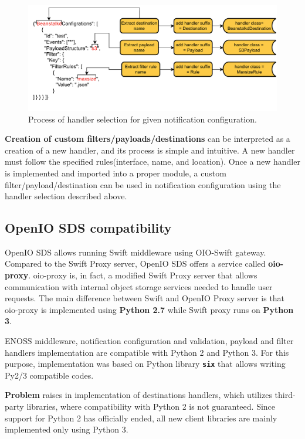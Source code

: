     \begin{figure}[H]
        \centering
        \includegraphics[width=1\textwidth]{obrazky-figures/enoss-handler-selection.pdf}
        \caption{Process of handler selection for given notification configuration.}
        \label{fig:enoss-handler-selection}
    \end{figure}

    \textbf{Creation of custom filters/payloads/destinations} can be interpreted as a creation of a new handler, and its process is simple and intuitive. A new handler must follow the specified rules(interface, name, and location). Once a new handler is implemented and imported into a proper module, a custom filter/payload/destination can be used in notification configuration using the handler selection described above.

    \subsection{OpenIO SDS compatibility}
    OpenIO SDS allows running Swift middleware using OIO-Swift gateway. Compared to the Swift Proxy server, OpenIO SDS offers a service called \textbf{oio-proxy}. oio-proxy is, in fact, a modified Swift Proxy server that allows communication with internal object storage services needed to handle user requests. The main difference between Swift and OpenIO Proxy server is that oio-proxy is implemented using \textbf{Python 2.7} while Swift proxy runs on \textbf{Python 3}.

    ENOSS middleware, notification configuration and validation, payload and filter handlers implementation are compatible with Python 2 and Python 3. For this purpose, implementation was based on Python library \textbf{\texttt{six}} that allows writing Py2/3 compatible codes.

    \textbf{Problem} raises in implementation of destinations handlers, which utilizes third-party libraries, where compatibility with Python 2 is not guaranteed. Since support for Python 2 has officially ended, all new client libraries are mainly implemented only using Python 3.

